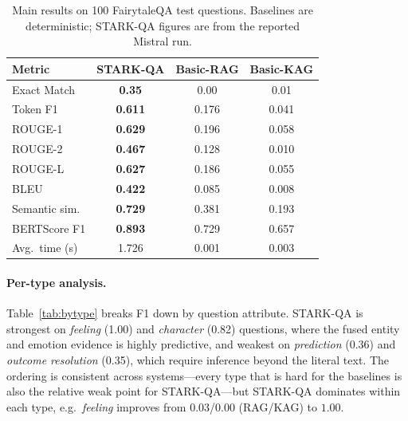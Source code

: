 \documentclass[11pt]{article}
\begin{document}
\begin{table}[t]
\centering
\small
\begin{tabular}{@{}lccc@{}}
\toprule
\textbf{Metric} & \textbf{STARK-QA} & \textbf{Basic-RAG} & \textbf{Basic-KAG} \\
\midrule
Exact Match    & \textbf{0.35}  & 0.00 & 0.01 \\
Token F1       & \textbf{0.611} & 0.176 & 0.041 \\
ROUGE-1        & \textbf{0.629} & 0.196 & 0.058 \\
ROUGE-2        & \textbf{0.467} & 0.128 & 0.010 \\
ROUGE-L        & \textbf{0.627} & 0.186 & 0.055 \\
BLEU           & \textbf{0.422} & 0.085 & 0.008 \\
Semantic sim.  & \textbf{0.729} & 0.381 & 0.193 \\
BERTScore F1   & \textbf{0.893} & 0.729 & 0.657 \\
\midrule
Avg.\ time (s) & 1.726 & 0.001 & 0.003 \\
\bottomrule
\end{tabular}
\caption{Main results on 100 FairytaleQA test questions. Baselines are
deterministic; STARK-QA figures are from the reported Mistral run.}
\label{tab:main}
\end{table}

\paragraph{Per-type analysis.} Table~\ref{tab:bytype} breaks F1 down by question
attribute. STARK-QA is strongest on \emph{feeling} (1.00) and \emph{character}
(0.82) questions, where the fused entity and emotion evidence is highly
predictive, and weakest on \emph{prediction} (0.36) and \emph{outcome
resolution} (0.35), which require inference beyond the literal text. The ordering
is consistent across systems---every type that is hard for the baselines is also
the relative weak point for STARK-QA---but STARK-QA dominates within each type,
e.g.\ \emph{feeling} improves from $0.03$/$0.00$ (RAG/KAG) to $1.00$.
\end{document}
